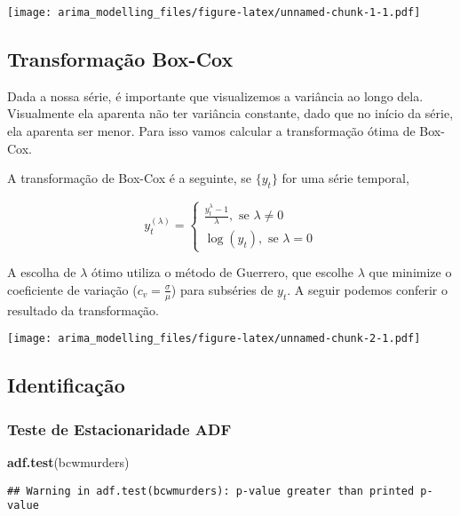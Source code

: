 \documentclass[]{article}
\newenvironment{Shaded}{\begin{snugshade}}{\end{snugshade}}
\newcommand{\KeywordTok}[1]{\textcolor[rgb]{0.13,0.29,0.53}{\textbf{#1}}}
\newcommand{\NormalTok}[1]{#1}
\begin{document}
\texttt{[image: arima\_modelling\_files/figure-latex/unnamed-chunk-1-1.pdf]}

\hypertarget{transformauxe7uxe3o-box-cox}{%
\subsection{Transformação Box-Cox}\label{transformauxe7uxe3o-box-cox}}

Dada a nossa série, é importante que visualizemos a variância ao longo
dela. Visualmente ela aparenta não ter variância constante, dado que no
início da série, ela aparenta ser menor. Para isso vamos calcular a
transformação ótima de Box-Cox.

A transformação de Box-Cox é a seguinte, se \(\{y_t\}\) for uma série
temporal,

\[
y_t^{(\lambda)} = \begin{cases} \frac{y_t^{\lambda} - 1}{\lambda}, \text{ se } \lambda \neq 0\\ \log(y_t),  \text{ se } \lambda = 0\end{cases}
\]

A escolha de \(\lambda\) ótimo utiliza o método de Guerrero, que escolhe
\(\lambda\) que minimize o coeficiente de variação
(\(c_v = \frac{\sigma}{\mu}\)) para subséries de \(y_t\). A seguir
podemos conferir o resultado da transformação.

\texttt{[image: arima\_modelling\_files/figure-latex/unnamed-chunk-2-1.pdf]}

\hypertarget{identificauxe7uxe3o}{%
\subsection{Identificação}\label{identificauxe7uxe3o}}

\hypertarget{teste-de-estacionaridade-adf}{%
\subsubsection{Teste de Estacionaridade
ADF}\label{teste-de-estacionaridade-adf}}

\begin{Shaded}
\begin{Highlighting}[]
\KeywordTok{adf.test}\NormalTok{(bcwmurders)}
\end{Highlighting}
\end{Shaded}

\begin{verbatim}
## Warning in adf.test(bcwmurders): p-value greater than printed p-value
\end{verbatim}
\end{document}
